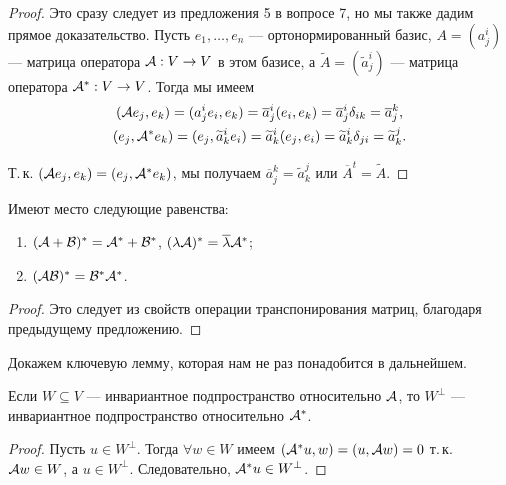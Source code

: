\begin{proof}
    Это сразу следует из предложения 5 в вопросе 7, но мы также дадим прямое доказательство. Пусть $e_1, \ldots, e_n$ --- ортонормированный базис, $A = (a^i_j)$ --- матрица оператора $\mathcal{A}: V \to V$ в этом базисе, а $\widetilde{A} = (\widetilde{a}^i_j)$ --- матрица оператора $\mathcal{A}^\ast: V \to V$. Тогда мы имеем
    \begin{gather*}
        (\mathcal{A} e_j, e_k) = (a^i_je_i, e_k) = \overline{a}^i_j(e_i, e_k) = \overline{a}^i_j\delta_{ik} = \overline{a}^k_j,\\
        (e_j, \mathcal{A}^\ast e_k) = (e_j, \widetilde{a}^i_ke_i) = \widetilde{a}^i_k(e_j, e_i) = \widetilde{a}^i_k\delta_{ji} = \widetilde{a}^j_k.
    \end{gather*}

    Т.\,к. $(\mathcal{A} e_j, e_k) = (e_j, \mathcal{A}^\ast e_k)$, мы получаем $\overline{a}^k_j = \widetilde{a}^j_k$ или $\overline{A}^t = \widetilde{A}$.
\end{proof}

\begin{proposal}
    Имеют место следующие равенства:
    \begin{enumerate}[nolistsep]
        \item $(\mathcal{A} + \mathcal{B})^\ast = \mathcal{A}^\ast + \mathcal{B}^\ast$, $(\lambda\mathcal{A})^\ast = \overline{\lambda}\mathcal{A}^\ast$;
        \item $(\mathcal{A}\mathcal{B})^\ast = \mathcal{B}^\ast\mathcal{A}^\ast$.
    \end{enumerate}
\end{proposal}

\begin{proof}
    Это следует из свойств операции транспонирования матриц, благодаря предыдущему предложению.
\end{proof}

Докажем ключевую лемму, которая нам не раз понадобится в дальнейшем.

\begin{lemma}[Важная]
    Если $W \subseteq V$ --- инвариантное подпространство относительно $\mathcal{A}$, то $W^\perp$ --- инвариантное подпространство относительно $\mathcal{A}^\ast$.
\end{lemma}

\begin{proof}
    Пусть $u \in W^\perp$. Тогда $\forall w \in W$ имеем $(\mathcal{A}^\ast u, w) = (u, \mathcal{A} w) = 0$ т.\,к. $\mathcal{A} w \in W$, а $u \in W^\perp$. Следовательно, $\mathcal{A}^\ast u \in W^\perp$.
\end{proof}

